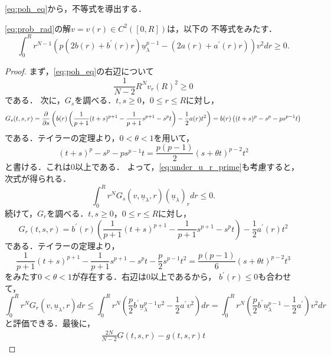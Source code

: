 \eqref{eq:poh_eq}から，不等式を導出する．

\begin{lem}
 \eqref{eq:prob_rad}の解$v = v(r) \in C^2([0, R])$は，以下の
 不等式をみたす．
 \begin{equation}
  \int_0^R r^{N-1} \left( p(2b(r) + b^\prime(r) r)
                    \underline{u}_\lambda^{p-1} 
                    - (2a(r) + a^\prime(r) r) \right) v^2 dr \geq 0.
  \label{eq:poh_ineq}
 \end{equation}
\end{lem}

\begin{proof}
 まず，\eqref{eq:poh_eq}の右辺について
 \begin{equation}
  \frac{1}{N-2} R^N v_r(R)^2 \geq 0 \label{eq:poh_ineq_0}
 \end{equation}
 である．
 次に，$G_s$を調べる．$t, s \geq 0$，$0 \leq r \leq R$に対し，
 \[
  G_s(t, s, r) = \frac{\partial }{\partial s} \left( b(r) \left( \frac{1}{p+1}
 (t+s)^{p+1} - \frac{1}{p+1}s^{p+1} - s^pt \right)
 - \frac{1}{2}a(r) t^2 \right) = b(r) \left( (t+s)^p - s^p -p s^{p-1}
 t \right)
 \]
 である．テイラーの定理より，$0 < \theta < 1$を用いて，
 \[
  (t+s)^p - s^p - ps^{p-1} t = \frac{p(p-1)}{2} (s + \theta t)^{p-2} t^2
 \]
 と書ける．これは$0$以上である．
 よって，\eqref{eq:under_u_r_prime}も考慮すると，次式が得られる．
 \begin{equation}
  \int_0^R r^N G_s(v, \underline{u}_\lambda, r)
   (\underline{u}_\lambda)_r dr \leq 0. \label{eq:poh_ineq_1}
 \end{equation}
 続けて，$G_r$を調べる．$t, s \geq 0$，$0 \leq r \leq R$に対し，
 \[
  G_r(t, s, r) = b^\prime(r) \left( \frac{1}{p+1} (t+s)^{p+1} -
 \frac{1}{p+1} s^{p+1} - s^{p} t \right) - \frac{1}{2} a^\prime(r) t^2
 \]
 である．テイラーの定理より，
 \[
  \frac{1}{p+1} (t+s)^{p+1} - \frac{1}{p+1} s^{p+1} -s^p t -
 \frac{p}{2} s^{p-1} t^2 = \frac{p(p-1)}{6} (s + \theta t)^{p-2} t^3
 \]
 をみたす$0 < \theta < 1$が存在する．右辺は$0$以上であるから，
 $b^\prime(r) \leq 0$も合わせて，
 \begin{equation}
  \int_0^R r^N G_r(v, \underline{u}_\lambda, r) dr \leq \int_0^R
   r^N \left( \frac{p}{2} b^\prime \underline{u}_\lambda^{p-1} v^2 -
    \frac{1}{2} a^\prime v^2 \right)dr = 
   \int_0^R r^N \left( \frac{p}{2} b^\prime \underline{u}_\lambda^{p-1} -
    \frac{1}{2} a^\prime \right) v^2 dr \label{eq:poh_ineq_2} 
 \end{equation}
 と評価できる．最後に，
 \begin{align*}
  \frac{2N}{N-2}G(t, s, r) - g(t, s, r)t 

\end{align*}
\end{proof}
